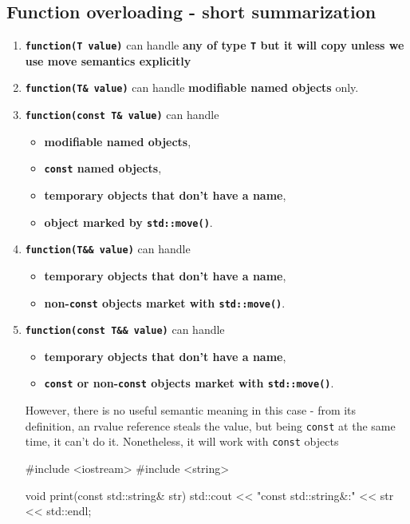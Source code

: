 \documentclass[../main]{subfiles}
\begin{document}
\subsection{Function overloading - short summarization}
\begin{enumerate}
    \item \textbf{\texttt{function(T value)}} can handle \textbf{any of type \texttt{T} but it will copy unless we use move semantics explicitly}
    \item \textbf{\texttt{function(T\& value)}} can handle \textbf{modifiable named objects} only.
    \item \textbf{\texttt{function(const T\& value)}} can handle
    \begin{itemize}
        \item \textbf{modifiable named objects},
        \item \textbf{\texttt{const} named objects},
        \item \textbf{temporary objects that don't have a name},
        \item \textbf{object marked by \texttt{std::move()}}.
    \end{itemize}
    \item \textbf{\texttt{function(T\&\& value)}} can handle
    \begin{itemize}
        \item \textbf{temporary objects that don't have a name},
        \item \textbf{non-\texttt{const} objects market with \texttt{std::move()}}.
    \end{itemize}
    \item \textbf{\texttt{function(const T\&\& value)}} can handle
    \begin{itemize}
        \item \textbf{temporary objects that don't have a name},
        \item \textbf{\texttt{const} or non-\texttt{const} objects market with \texttt{std::move()}}.
    \end{itemize}
    However, there is no useful semantic meaning in this case - from its definition, an rvalue reference steals the value,
    but being \texttt{const} at the same time, it can't do it. Nonetheless, it will work with \texttt{const} objects
    \begin{Code}
        #include <iostream>
        #include <string>
        
        void print(const std::string& str)
        {
            std::cout << "const std::string&:" << str << std::endl;
        }
        

\end{Code}
\end{enumerate}
\end{document}
